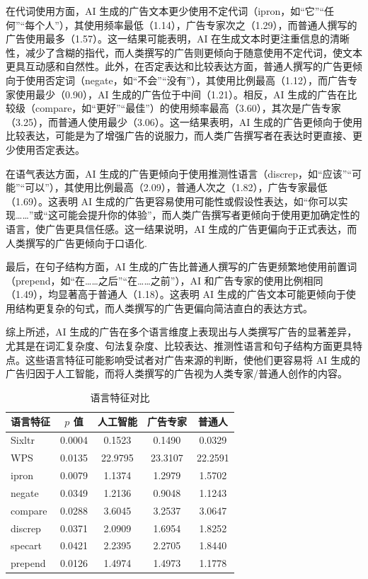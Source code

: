 在代词使用方面，AI 生成的广告文本更少使用不定代词（ipron，如“它”“任何”“每个人”），其使用频率最低（1.14），广告专家次之（1.29），而普通人撰写的广告使用最多（1.57）。这一结果可能表明，AI 在生成文本时更注重信息的清晰性，减少了含糊的指代，而人类撰写的广告则更倾向于随意使用不定代词，使文本更具互动感和自然性。此外，在否定表达和比较表达方面，普通人撰写的广告更倾向于使用否定词（negate，如“不会”“没有”），其使用比例最高（1.12），而广告专家使用最少（0.90），AI 生成的广告位于中间（1.21）。相反，AI 生成的广告在比较级（compare，如“更好”“最佳”）的使用频率最高（3.60），其次是广告专家（3.25），而普通人使用最少（3.06）。这一结果表明，AI 生成的广告更倾向于使用比较表达，可能是为了增强广告的说服力，而人类广告撰写者在表达时更直接、更少使用否定表达。

在语气表达方面，AI 生成的广告更倾向于使用推测性语言（discrep，如“应该”“可能”“可以”），其使用比例最高（2.09），普通人次之（1.82），广告专家最低（1.69）。这表明 AI 生成的广告更容易使用可能性或假设性表达，如“你可以实现……”或“这可能会提升你的体验”，而人类广告撰写者更倾向于使用更加确定性的语言，使广告更具信任感。这一结果说明，AI 生成的广告更偏向于正式表达，而人类撰写的广告更倾向于口语化.

最后，在句子结构方面，AI 生成的广告比普通人撰写的广告更频繁地使用前置词（prepend，如“在……之后”“在……之前”），AI 和广告专家的使用比例相同（1.49），均显著高于普通人（1.18）。这表明 AI 生成的广告文本可能更倾向于使用结构更复杂的句式，而人类撰写的广告更偏向简洁直白的表达方式。

综上所述，AI 生成的广告在多个语言维度上表现出与人类撰写广告的显著差异，尤其是在词汇复杂度、句法复杂度、比较表达、推测性语言和句子结构方面更具特点。这些语言特征可能影响受试者对广告来源的判断，使他们更容易将 AI 生成的广告归因于人工智能，而将人类撰写的广告视为人类专家/普通人创作的内容。


\begin{table}[htbp]
    \centering
    \caption{\label{tab:Study4-substudy1-linguistic_features} 语言特征对比}
    {\tablesongti %
    \renewcommand{\arraystretch}{1.5} %
    \begin{tabular}{l c c c c} %
        \toprule
        \textbf{语言特征} & \textbf{\( p \) 值}& \textbf{人工智能} & \textbf{广告专家} & \textbf{普通人} \\
        \midrule
        Sixltr & 0.0004 & 0.1523 & 0.1490 & 0.0329 \\
        WPS & 0.0135 & 22.9795 & 23.3107 & 22.2591 \\
        ipron & 0.0079 & 1.1374 & 1.2979 & 1.5702 \\
        negate & 0.0349 & 1.2136 & 0.9048 & 1.1243 \\
        compare & 0.0288 & 3.6045 & 3.2537 & 3.0647 \\
        discrep & 0.0371 & 2.0909 & 1.6954 & 1.8252 \\
        specart & 0.0421 & 2.2395 & 2.2705 & 1.8440 \\
        prepend & 0.0126 & 1.4974 & 1.4973 & 1.1778 \\
        \bottomrule
    \end{tabular}
    }
\end{table}




